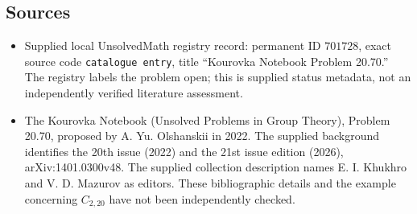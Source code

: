 \documentclass[11pt]{article}
\begin{document}
\subsection{Sources}
\begin{itemize}
\item Supplied local UnsolvedMath registry record: permanent ID \(701728\), exact source code \texttt{catalogue entry}, title ``Kourovka Notebook Problem 20.70.'' The registry labels the problem open; this is supplied status metadata, not an independently verified literature assessment.
\item The Kourovka Notebook (Unsolved Problems in Group Theory), Problem 20.70, proposed by A. Yu. Olshanskii in 2022. The supplied background identifies the 20th issue (2022) and the 21st issue edition (2026), arXiv:1401.0300v48. The supplied collection description names E. I. Khukhro and V. D. Mazurov as editors. These bibliographic details and the example concerning \(C_{2,20}\) have not been independently checked.
\end{itemize}
\end{document}
